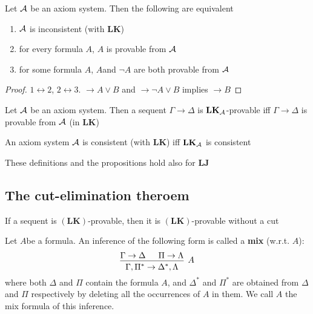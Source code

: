 \documentclass[11pt]{article}
\def \LJ {\textbf{LJ}}
\def \LK {\textbf{LK}}
\begin{document}
\begin{proposition}[]
Let \(\mathcal{A}\) be an axiom system. Then the following are equivalent
\begin{enumerate}
\item \(\mathcal{A}\) is inconsistent (with \(\LK\))
\item for every formula \(A\), \(A\) is provable from \(\mathcal{A}\)
\item for some formula \(A\), \(A\)and \(\neg A\) are both provable from \(\mathcal{A}\)
\end{enumerate}
\end{proposition}

\begin{proof}
\(1\leftrightarrow 2\), \(2\leftrightarrow3\). \(\to A\vee B\) and
\(\to \neg A\vee B\) implies \(\to B\)
\end{proof}

\begin{proposition}[]
Let \(\mathcal{A}\) be an axiom system. Then a sequent \(\Gamma\to \Delta\) is
\(\LK_{\cala}\)-provable iff \(\Gamma\to\Delta\) is provable from \(\mathcal{A}\)
(in \(\LK\))
\end{proposition}

\begin{corollary}[]
An axiom system \(\mathcal{A}\) is consistent (with \(\LK\)) iff \(\LK_{\cala}\) is consistent
\end{corollary}

These definitions and the propositions hold also for \(\LJ\)

\subsection{The cut-elimination theroem}
\label{sec:org2e50e9e}
\begin{theorem}
\label{thm5.1}
If a sequent is \((\LK)\)-provable, then it is \((\LK)\)-provable without a cut
\end{theorem}

Let \(A\)be a formula. An inference of the following form is called a \textbf{mix}
(w.r.t. \(A\)):
\begin{equation*}
\begin{prooftree}%
\hypo{\Gamma\to\Delta}
\hypo{\Pi\to\Lambda}
\infer2[\(A\)]{\Gamma,\Pi^* \to \Delta^*, \Lambda}
\end{prooftree}
\end{equation*}
where both \(\Delta\) and \(\Pi\) contain the formula \(A\), and \(\Delta^*\) and \(\Pi^*\) are
obtained from \(\Delta\) and \(\Pi\) respectively by deleting all the occurrences of \(A\)
in them. We call \(A\) the mix formula of this inference.
\end{document}
